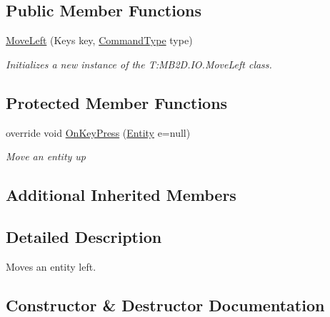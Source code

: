 \subsection*{Public Member Functions}
\begin{DoxyCompactItemize}
\item 
\hyperlink{class_m_b2_d_1_1_i_o_1_1_move_left_a0b3941cc163804d9ae7adfbb99815ad5}{Move\+Left} (Keys key, \hyperlink{namespace_m_b2_d_1_1_i_o_ab5f95f3fe9e652778b62bdf943168a68}{Command\+Type} type)
\begin{DoxyCompactList}\small\item\em Initializes a new instance of the T\+:\+M\+B2\+D.\+I\+O.\+Move\+Left class. \end{DoxyCompactList}\end{DoxyCompactItemize}
\subsection*{Protected Member Functions}
\begin{DoxyCompactItemize}
\item 
override void \hyperlink{class_m_b2_d_1_1_i_o_1_1_move_left_aa74df62134ee5fc3a5b2503114a5a7e6}{On\+Key\+Press} (\hyperlink{class_m_b2_d_1_1_entity_component_1_1_entity}{Entity} e=null)
\begin{DoxyCompactList}\small\item\em Move an entity up \end{DoxyCompactList}\end{DoxyCompactItemize}
\subsection*{Additional Inherited Members}


\subsection{Detailed Description}
Moves an entity left. 



\subsection{Constructor \& Destructor Documentation}
\hypertarget{class_m_b2_d_1_1_i_o_1_1_move_left_a0b3941cc163804d9ae7adfbb99815ad5}{}\label{class_m_b2_d_1_1_i_o_1_1_move_left_a0b3941cc163804d9ae7adfbb99815ad5} 
